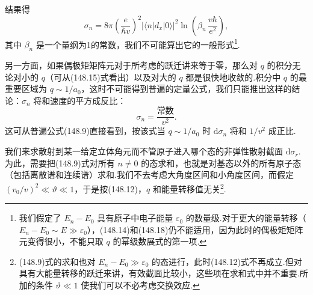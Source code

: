 结果得
\begin{equation}
  \sigma_n=8\pi\left(\frac{e}{\hbar v}\right)^2|\langle n|d_x|0\rangle|^2
  \ln\left(\beta_n\,\frac{v\hbar}{e^2}\right),
\end{equation}
其中 $\beta_n$ 是一个量纲为1的常数，我们不可能算出它的一般形式\footnote{我们假定了 $E_n-E_0$ 具有原子中电子能量 $\varepsilon_0$ 的数量级.对于更大的能量转移（$E_n-E_0\sim E\gg\varepsilon_0$），(148.14)和(148.18)仍不能适用，因为此时的偶极矩矩阵元变得很小，不能只取 $q$ 的幂级数展式的第一项.}.

另一方面，如果偶极矩矩阵元对于所考虑的跃迁讲来等于零，那么对 $q$ 的积分无论对小的 $q$（可从(148.15)式看出）以及对大的 $q$ 都是很快地收敛的.积分中 $q$ 的最重要区域为 $q\sim1/a_0$，这时不可能得到普遍的定量公式，我们只能推出这样的结论：$\sigma_n$ 将和速度的平方成反比：
\begin{equation}
  \sigma_n=\frac{\text{常数}}{v^2}.
\end{equation}
这可从普遍公式(148.9)直接看到，按该式当 $q\sim1/a_0$ 时 $\mathrm{d}\sigma_n$ 将和 $1/v^2$ 成正比.

我们来求散射到某一给定立体角元而不管原子进入哪个态的非弹性散射截面 $\mathrm{d}\sigma_r$.为此，需要把(148.9)式对所有 $n\neq0$ 的态求和，也就是对基态以外的所有原子态（包括离散谱和连续谱）求和.我们不去考虑大角度区间和小角度区间，而假定 $(v_0/v)^2\ll\vartheta\ll1$，于是按(148.12)，$q$ 和能量转移值无关\footnote{(148.9)式的求和也对 $E_n-E_0\gg\varepsilon_0$ 的态进行，此时(148.12)式不再成立.但对具有大能量转移的跃迁来讲，有效截面比较小，这些项在求和式中并不重要.所加的条件 $\vartheta\ll1$ 使我们可以不必考虑交换效应.}.

